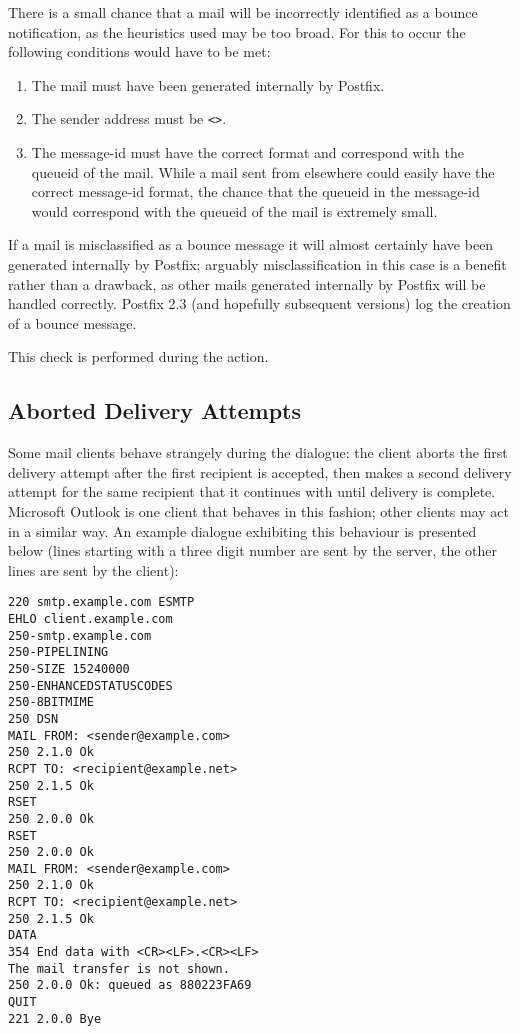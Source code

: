 There is a small chance that a mail will be incorrectly identified as a
bounce notification, as the heuristics used may be too broad.  For this to
occur the following conditions would have to be met:

\begin{enumerate}

    \item The mail must have been generated internally by Postfix.

    \item The sender address must be \verb!<>!.\glsadd{<>}

    \item The message-id must have the correct format and correspond with
        the queueid of the mail.  While a mail sent from elsewhere could
        easily have the correct message-id format, the chance that the
        queueid in the message-id would correspond with the queueid of the
        mail is extremely small.

\end{enumerate}

If a mail is misclassified as a bounce message it will almost certainly
have been generated internally by Postfix; arguably misclassification in
this case is a benefit rather than a drawback, as other mails generated
internally by Postfix will be handled correctly.  Postfix 2.3 (and
hopefully subsequent versions) log the creation of a bounce message.

This check is performed during the  action.

\subsection{Aborted Delivery Attempts}

\label{aborted delivery attempts}

Some mail clients behave strangely during the  dialogue: the
client aborts the first delivery attempt after the first recipient is
accepted, then makes a second delivery attempt for the same recipient that
it continues with until delivery is complete.  Microsoft Outlook is one
client that behaves in this fashion; other clients may act in a similar
way.  An example dialogue exhibiting this behaviour is presented below
(lines starting with a three digit number are sent by the server, the other
lines are sent by the client):

\begin{verbatim}
220 smtp.example.com ESMTP
EHLO client.example.com
250-smtp.example.com
250-PIPELINING
250-SIZE 15240000
250-ENHANCEDSTATUSCODES
250-8BITMIME
250 DSN
MAIL FROM: <sender@example.com>
250 2.1.0 Ok
RCPT TO: <recipient@example.net>
250 2.1.5 Ok
RSET
250 2.0.0 Ok
RSET
250 2.0.0 Ok
MAIL FROM: <sender@example.com>
250 2.1.0 Ok
RCPT TO: <recipient@example.net>
250 2.1.5 Ok
DATA
354 End data with <CR><LF>.<CR><LF>
The mail transfer is not shown.
250 2.0.0 Ok: queued as 880223FA69
QUIT
221 2.0.0 Bye
\end{verbatim}

